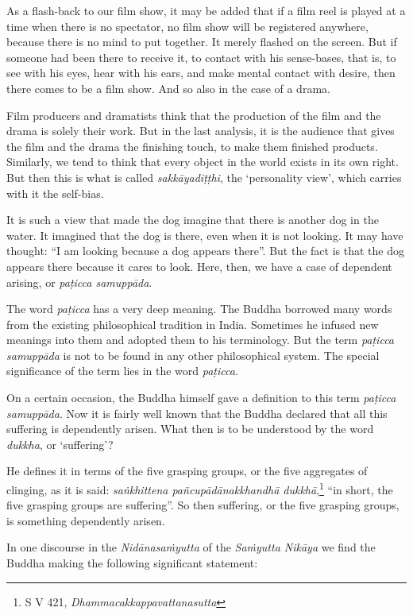 As a flash-back to our film show, it may be added that if a film reel is played at a time when there is no spectator, no film show will be registered anywhere, because there is no mind to put together. It merely flashed on the screen. But if someone had been there to receive it, to contact with his sense-bases, that is, to see with his eyes, hear with his ears, and make mental contact with desire, then there comes to be a film show. And so also in the case of a drama.

Film producers and dramatists think that the production of the film and the drama is solely their work. But in the last analysis, it is the audience that gives the film and the drama the finishing touch, to make them finished products. Similarly, we tend to think that every object in the world exists in its own right. But then this is what is called \emph{sakkāyadiṭṭhi}, the `personality view', which carries with it the self-bias.

It is such a view that made the dog imagine that there is another dog in the water. It imagined that the dog is there, even when it is not looking. It may have thought: ``I am looking because a dog appears there''. But the fact is that the dog appears there because it cares to look. Here, then, we have a case of dependent arising, or \emph{paṭicca samuppāda}.

The word \emph{paṭicca} has a very deep meaning. The Buddha borrowed many words from the existing philosophical tradition in India. Sometimes he infused new meanings into them and adopted them to his terminology. But the term \emph{paṭicca samuppāda} is not to be found in any other philosophical system. The special significance of the term lies in the word \emph{paṭicca}.

On a certain occasion, the Buddha himself gave a definition to this term \emph{paṭicca samuppāda}. Now it is fairly well known that the Buddha declared that all this suffering is dependently arisen. What then is to be understood by the word \emph{dukkha}, or `suffering'?

He defines it in terms of the five grasping groups, or the five aggregates of clinging, as it is said: \emph{saṅkhittena pañcupādānakkhandhā dukkhā},\footnote{S V 421, \emph{Dhammacakkappavattanasutta}} ``in short, the five grasping groups are suffering''. So then suffering, or the five grasping groups, is something dependently arisen.

In one discourse in the \emph{Nidānasaṁyutta} of the \emph{Saṁyutta Nikāya} we find the Buddha making the following significant statement:

